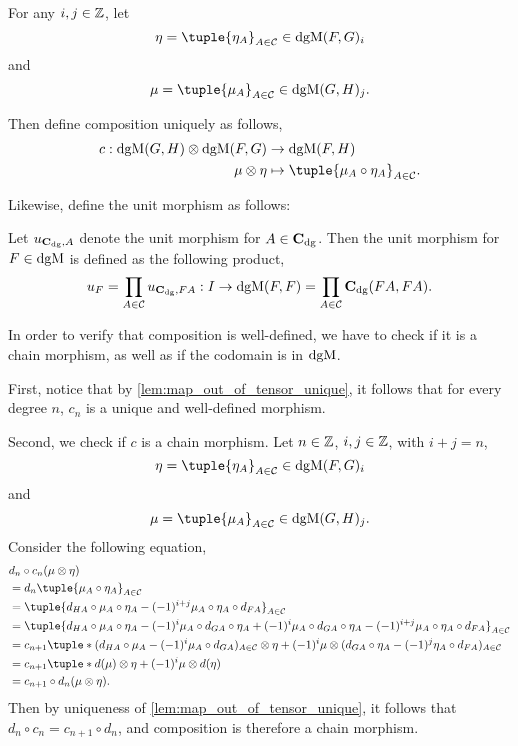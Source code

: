 \begin{remark}
    For any \( i, j \in {\mathbb{Z}} \), let
    \[
        \eta = \tuple{\eta_A}_{A \in \Cc} \in \dgM(F, G)_i
    \]
    and
    \[
        \mu = \tuple{\mu_A}_{A \in \Cc} \in \dgM(G, H)_j.
    \]

    Then define composition uniquely as follows,
    \begin{align*}
        c: \dgM(G, H) \otimes \dgM(F, G) &\to \dgM(F, H) \\
        \mu \otimes \eta &\mapsto \tuple{\mu_A \circ \eta_A}_{A \in \Cc}.
    \end{align*}

    Likewise, define the unit morphism as follows:
    
    Let \( u_{\operatorname{\mathbf{C}}_{\operatorname{dg}}, A} \) denote the unit morphism for \( A \in \operatorname{\mathbf{C}}_{\operatorname{dg}} \). Then the unit morphism for \( F \in \operatorname{dgM} \) is defined as the following product,
    \[
        u_F = \prod_{A \in {\mathcal{C}}} u_{\operatorname{\mathbf{C}}_{\operatorname{dg}}, F A} : I \to \operatorname{dgM}(F, F) = \prod_{A \in {\mathcal{C}}} \operatorname{\mathbf{C}}_{\operatorname{dg}}(F A, F A).
    \]

    In order to verify that composition is well-defined, we have to check if it is a chain morphism, as well as if the codomain is in \( \operatorname{dgM} \).

    First, notice that by \autoref{lem:map_out_of_tensor_unique}, it follows that for every degree \( n \), \( c_n \) is a unique and well-defined morphism.

    Second, we check if \( c \) is a chain morphism. Let \( n \in {\mathbb{Z}} \), \( i, j \in {\mathbb{Z}} \), with \( i + j = n \),
    \[
        \eta = \tuple{\eta_A}_{A \in \Cc} \in \dgM(F, G)_i
    \]
    and
    \[
        \mu = \tuple{\mu_A}_{A \in \Cc} \in \dgM(G, H)_j.
    \]
    Consider the following equation,
    \begin{align*}
        &d_n \circ c_n (\mu \otimes \eta) \\
        &= d_n \tuple{\mu_A \circ \eta_A}_{A \in \Cc} \\
        &= \tuple{d_{H A} \circ \mu_A \circ \eta_A - (-1)^{i + j} \mu_A \circ \eta_A \circ d_{F A}}_{A \in \Cc} \\
        &= \tuple{d_{H A} \circ \mu_A \circ \eta_A - (-1)^i \mu_A \circ d_{G A} \circ \eta_A + (-1)^i \mu_A \circ d_{G A} \circ \eta_A - (-1)^{i + j} \mu_A \circ \eta_A \circ d_{F A}}_{A \in \Cc} \\
        &= c_{n + 1} \tuple*{ (d_{H A} \circ \mu_A - (-1)^i \mu_A \circ d_{G A})_{A \in \Cc} \otimes \eta + (-1)^i \mu \otimes (d_{G A} \circ \eta_A - (-1)^j \eta_A \circ d_{F A})_{A \in \Cc} } \\
        &= c_{n + 1} \tuple*{ d(\mu) \otimes \eta + (-1)^i \mu \otimes d(\eta) } \\
        &= c_{n + 1} \circ d_n (\mu \otimes \eta).
    \end{align*}
    Then by uniqueness of \autoref{lem:map_out_of_tensor_unique}, it follows that \( d_n \circ c_n = c_{n + 1} \circ d_n \), and composition is therefore a chain morphism.
    

\end{remark}

